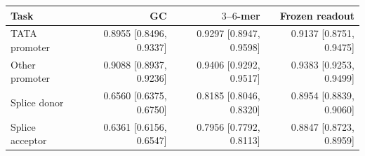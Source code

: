 \begin{tabular}{lrrr}
\toprule
Task & GC & $3$--$6$-mer & Frozen readout \\
\midrule
TATA promoter & 0.8955 [0.8496, 0.9337] & 0.9297 [0.8947, 0.9598] & 0.9137 [0.8751, 0.9475] \\
Other promoter & 0.9088 [0.8937, 0.9236] & 0.9406 [0.9292, 0.9517] & 0.9383 [0.9253, 0.9499] \\
Splice donor & 0.6560 [0.6375, 0.6750] & 0.8185 [0.8046, 0.8320] & 0.8954 [0.8839, 0.9060] \\
Splice acceptor & 0.6361 [0.6156, 0.6547] & 0.7956 [0.7792, 0.8113] & 0.8847 [0.8723, 0.8959] \\
\bottomrule
\end{tabular}
